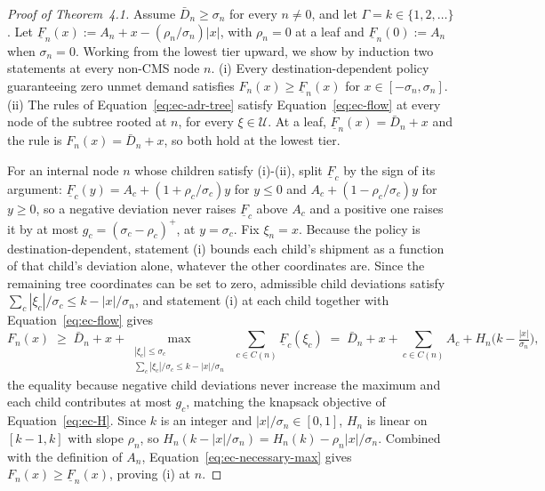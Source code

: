 \documentclass[11pt]{article}
\begin{document}
\begin{proof}[Proof of Theorem~4.1]
Assume $\bar D_n\ge\sigma_n$ for every $n\ne0$, and let $\Gamma=k\in\{1,2,\dots\}$.
Let $\underline F_n(x) := A_n+x-(\rho_n/\sigma_n)|x|$, with $\rho_n=0$ at a leaf and $\underline F_n(0) := A_n$ when $\sigma_n=0$.
Working from the lowest tier upward, we show by induction two statements at every non-CMS node $n$.
(i) Every destination-dependent policy guaranteeing zero unmet demand satisfies $F_n(x)\ge\underline F_n(x)$ for $x\in[-\sigma_n,\sigma_n]$.
(ii) The rules of Equation~\ref{eq:ec-adr-tree} satisfy Equation~\ref{eq:ec-flow} at every node of the subtree rooted at $n$, for every $\xi\in\mathcal U$.
At a leaf, $\underline F_n(x)=\bar D_n+x$ and the rule is $F_n(x)=\bar D_n+x$, so both hold at the lowest tier.

For an internal node $n$ whose children satisfy (i)-(ii), split $\underline F_c$ by the sign of its argument: $\underline F_c(y)=A_c+(1+\rho_c/\sigma_c)y$ for $y\le0$ and $A_c+(1-\rho_c/\sigma_c)y$ for $y\ge0$, so a negative deviation never raises $\underline F_c$ above $A_c$ and a positive one raises it by at most $g_c=(\sigma_c-\rho_c)^+$, at $y=\sigma_c$.
Fix $\xi_n=x$.
Because the policy is destination-dependent, statement (i) bounds each child's shipment as a function of that child's deviation alone, whatever the other coordinates are.
Since the remaining tree coordinates can be set to zero, admissible child deviations satisfy $\sum_{c}|\xi_c|/\sigma_c\le k-|x|/\sigma_n$, and statement (i) at each child together with Equation~\ref{eq:ec-flow} gives
\begin{equation}
F_n(x) \;\ge\; \bar D_n+x+\max_{\substack{|\xi_c|\le\sigma_c\\ \sum_c|\xi_c|/\sigma_c\le k-|x|/\sigma_n}}\ \textstyle\sum_{c\in C(n)}\underline F_c(\xi_c)
\;=\; \bar D_n+x+\textstyle\sum_{c\in C(n)}A_c+H_n\big(k-\tfrac{|x|}{\sigma_n}\big),
\label{eq:ec-necessary-max}
\end{equation}
the equality because negative child deviations never increase the maximum and each child contributes at most $g_c$, matching the knapsack objective of Equation~\ref{eq:ec-H}.
Since $k$ is an integer and $|x|/\sigma_n\in[0,1]$, $H_n$ is linear on $[k-1,k]$ with slope $\rho_n$, so $H_n(k-|x|/\sigma_n)=H_n(k)-\rho_n|x|/\sigma_n$.
Combined with the definition of $A_n$, Equation~\ref{eq:ec-necessary-max} gives $F_n(x)\ge\underline F_n(x)$, proving (i) at $n$.


\end{proof}
\end{document}
